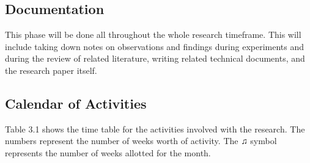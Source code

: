 \subsection{Documentation}
This phase will be done all throughout the whole research timeframe. This will include taking down notes on observations and findings during experiments and during the review of related literature, writing related technical documents, and the research paper itself.


\subsection{Calendar of Activities}
Table 3.1 shows the time table for the activities involved with the research. The numbers represent the number of weeks worth of activity. The ♫ symbol represents the number of weeks allotted for the month.

\nocite{Dubnov}
\nocite{Azcarraga2016}
\nocite{cambouropoulosEmilios}
\nocite{3dsom}
\nocite{correa}
\nocite{imogen}
\nocite{libin}
\nocite{foote}
\nocite{silla}
\nocite{mcfee}
\nocite{hepokoski}